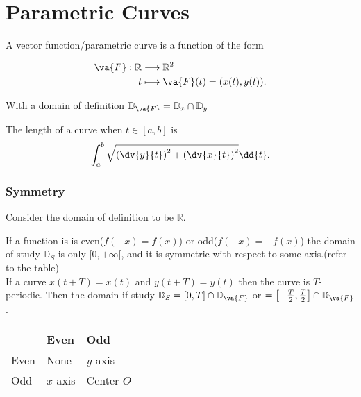 \part{Parametric Curves}

A vector function/parametric curve is a function of the form

\begin{align*}
	\va{F}: \mathbb{R} & \longrightarrow \mathbb{R}^2        \\
	t                  & \longmapsto \va{F}(t) = (x(t),y(t))
	.\end{align*}

With a domain of definition $\mathbb{D}_{\va{F}} = \mathbb{D}_x \cap \mathbb{D}_y$

\begin{remark}
	The length of a curve when $t\in[a,b]$ is
	\[
		\int^b_a\sqrt{\left( \dv{y}{t}  \right)^2 +\left( \dv{x}{t}  \right)^2 } \dd {t}
		.\]

\end{remark}

\section{Symmetry}

Consider the domain of definition to be $\mathbb{R}$.

If a function is is even($f(-x)=f(x)$) or odd($f(-x)=-f(x)$) the domain of study $ \mathbb{D}_S$ is only $[0,+\infty[$, and it is symmetric with respect to some axis.(refer to the table)\\

If a curve $x(t+T)=x(t)$ and $y(t+T)=y(t)$ then the curve is  $T$-periodic. Then the domain if study $\mathbb{D}_S = [0,T]\cap\mathbb{D}_{\va{F}}$ or $=\left[-\frac{T}{2},\frac{T}{2}\right]\cap\mathbb{D}_{\va{F}}$.\\
\begin{margintable}
	\begin{tabular}{|l||l|l|}
		\hline
		\backslashbox{$y$}{$x$} & Even     & Odd        \\
		\hline\hline
		Even                    & None     & $y$-axis   \\
		\hline
		Odd                     & $x$-axis & Center $O$ \\
		\hline
	\end{tabular}
	\caption{Axis of symmetry of $\va{F}(t)$ depending on the nature of $x$ and $y$.}
\end{margintable}

